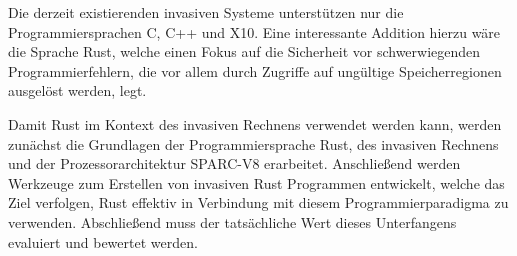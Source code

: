 Die derzeit existierenden invasiven Systeme unterstützen nur die Programmiersprachen C, C++ und X10.
Eine interessante Addition hierzu wäre die Sprache Rust,
welche einen Fokus auf die Sicherheit vor schwerwiegenden Programmierfehlern, die vor 
allem durch Zugriffe auf ungültige Speicherregionen ausgelöst werden, legt.

Damit Rust im Kontext des invasiven Rechnens verwendet werden kann,
werden zunächst die Grundlagen der Programmiersprache Rust,
des invasiven Rechnens und der Prozessorarchitektur SPARC-V8 erarbeitet.
Anschließend werden Werkzeuge zum Erstellen von invasiven
Rust Programmen entwickelt, welche das Ziel verfolgen,
Rust effektiv in Verbindung mit diesem Programmierparadigma zu verwenden.
Abschließend muss der tatsächliche Wert dieses Unterfangens evaluiert und bewertet werden.
